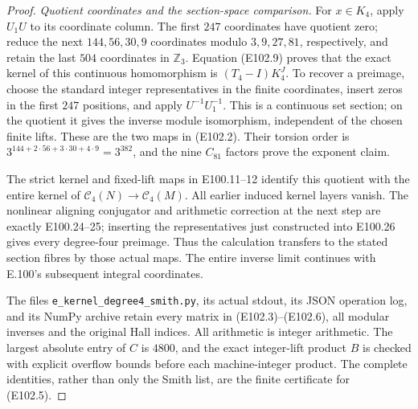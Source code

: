 \begin{proof}
\emph{Quotient coordinates and the section-space comparison.}
For $x\in K_4$, apply $U_1U$ to its coordinate column.
The first $247$ coordinates have quotient zero;
reduce the next $144,56,30,9$ coordinates modulo
$3,9,27,81$, respectively, and retain the last $504$
coordinates in $\mathbb Z_3$.
Equation (E102.9) proves that the exact kernel of this
continuous homomorphism is $(T_4-I)K_4^J$.
To recover a preimage, choose the standard integer
representatives in the finite coordinates, insert
zeros in the first $247$ positions, and apply
$U^{-1}U_1^{-1}$. This is a continuous set section;
on the quotient it gives the inverse module
isomorphism, independent of the chosen finite lifts.
These are the two maps in (E102.2).
Their torsion order is
$3^{144+2\cdot56+3\cdot30+4\cdot9}=3^{382}$,
and the nine $C_{81}$ factors prove the exponent claim.

The strict kernel and fixed-lift maps in E100.11--12
identify this quotient with the entire kernel of
$\mathcal C_4(N)\to\mathcal C_4(M)$.
All earlier induced kernel layers vanish.
The nonlinear aligning conjugator and arithmetic
correction at the next step are exactly E100.24--25;
inserting the representatives just constructed into
E100.26 gives every degree-four preimage.
Thus the calculation transfers to the stated section
fibres by those actual maps. The entire inverse limit
continues with E.100's subsequent integral coordinates.

The files \texttt{e\_kernel\_degree4\_smith.py},
its actual stdout, its JSON operation log, and its
NumPy archive retain every matrix in (E102.3)--(E102.6),
all modular inverses and the original Hall indices.
All arithmetic is integer arithmetic. The largest
absolute entry of $C$ is $4800$, and the exact
integer-lift product $B$ is checked with explicit
overflow bounds before each machine-integer product.
The complete identities, rather than only the Smith
list, are the finite certificate for (E102.5).
\end{proof}
